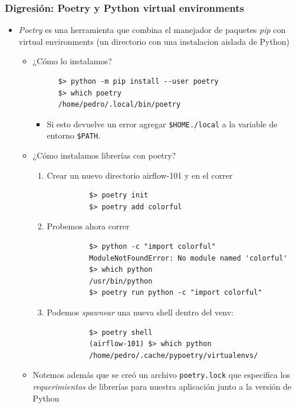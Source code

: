 \documentclass[leqno, 10pt, envcountsect]{beamer}
\numberwithin{equation}{section}
\theoremstyle{definition}
\theoremstyle{example}
\numberwithin{figure}{section}
\numberwithin{table}{section}
\let\olditem\item
\renewcommand{\item}{%
\olditem\vspace{1pt}}
\begin{document}
\begin{frame}[fragile=singleslide]
  \frametitle{Digresión: Poetry y Python virtual environments}
  \begin{itemize}
    \item \textit{Poetry} es una herramienta que combina el manejador de
      paquetes \textit{pip} con virtual environments (un directorio con una
      instalacion aislada de Python)
    \begin{itemize}
      \item ¿Cómo lo instalamos?
      \begin{verbatim}
      $> python -m pip install --user poetry
      $> which poetry
      /home/pedro/.local/bin/poetry
      \end{verbatim}
      \begin{itemize}
        \item Si esto devuelve un error agregar \texttt{\$HOME./local} a la
          variable de entorno \texttt{\$PATH}.
      \end{itemize}
      \item ¿Cómo instalamos librerías con poetry?
        \begin{enumerate}
          \item Crear un nuevo directorio airflow-101 y en el correr
          \begin{verbatim}
          $> poetry init
          $> poetry add colorful
          \end{verbatim}
        \item Probemos ahora correr
          \begin{verbatim}
          $> python -c "import colorful"
          ModuleNotFoundError: No module named 'colorful'
          $> which python
          /usr/bin/python
          $> poetry run python -c "import colorful"
          \end{verbatim}
        \item Podemos \textit{spawnear} una nueva shell dentro del venv:
          \begin{verbatim}
          $> poetry shell
          (airflow-101) $> which python
          /home/pedro/.cache/pypoetry/virtualenvs/
          \end{verbatim}
        \end{enumerate}
    \item Notemos además que se creó un archivo \texttt{poetry.lock} que
      especifica los \textit{requerimientos} de librerías para nuestra
        aplicación junto a la versión de Python
    \end{itemize}
  \end{itemize}
\end{frame}
\end{document}
